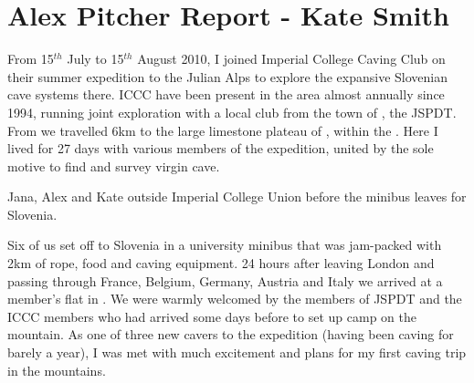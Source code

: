 \section{Alex Pitcher Report - Kate Smith}



From 15\(^{th}\) July to 15\(^{th}\) August 2010, I joined Imperial College Caving Club on their summer expedition
to the Julian Alps to explore the expansive Slovenian cave systems there. ICCC have been present
in the area almost annually since 1994, running joint exploration with a local club from the town
of , the JSPDT. From  we travelled 6km to the large limestone plateau of , within the . Here I lived for 27 days with various members of the
expedition, united by the sole motive to find and survey virgin cave.



    \begin{marginfigure}
\checkoddpage \ifoddpage \forcerectofloat \else \forceversofloat \fi
\centering
 \caption{Jana, Alex and Kate outside Imperial College Union before the minibus leaves for Slovenia. }
 \label{bus union 2010}
\end{marginfigure}


Six of us set off to Slovenia in a university minibus that was jam-packed with 2km of rope, food
and caving equipment. 24 hours after leaving London and passing through France, Belgium, Germany,
Austria and Italy we arrived at a member's flat in . We were warmly welcomed by the members
of JSPDT and the ICCC members who had arrived some days before to set up camp on the mountain.
As one of three new cavers to the expedition (having been caving for barely a year), I was met with
much excitement and plans for my first caving trip in the mountains.

